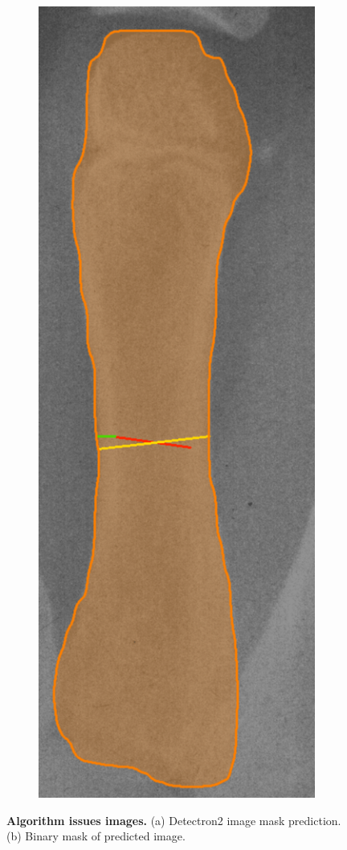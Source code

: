 \begin{figure}[!ht]
\begin{subfigure}[b]{.3\textwidth}
       \includegraphics[width=.8\textwidth]{obrazky-figures/wrong_width.pdf}
        \caption{}\label{wrong-width}
    \end{subfigure}
    \caption{\textbf{Algorithm issues images.} (a) Detectron2 image mask prediction. (b) Binary mask of predicted image.}
    \label{algorithm-issues}
\end{figure}



